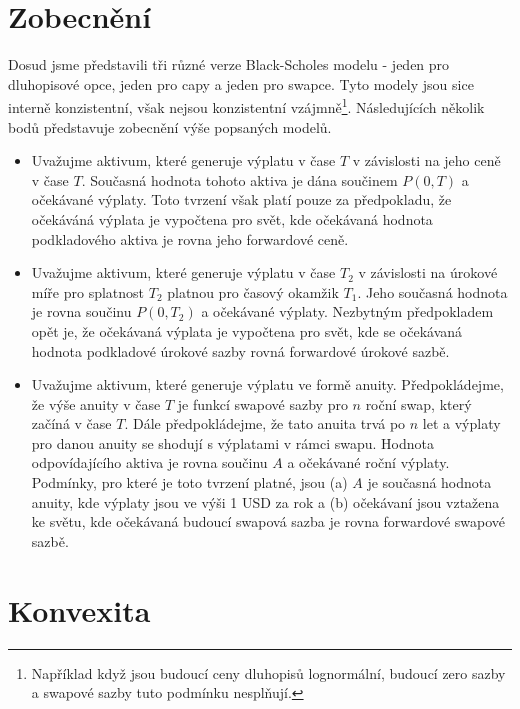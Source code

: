 \documentclass[a4paper]{book}
\begin{document}
\section{Zobecnění}

Dosud jsme představili tři různé verze Black-Scholes modelu - jeden pro dluhopisové opce, jeden pro capy a jeden pro swapce. Tyto modely jsou sice interně konzistentní, však nejsou konzistentní vzájmně\footnote{Například když jsou budoucí ceny dluhopisů lognormální, budoucí zero sazby a swapové sazby tuto podmínku nesplňují.}. Následujících několik bodů představuje zobecnění výše popsaných modelů.
\begin{itemize}
\item Uvažujme aktivum, které generuje výplatu v čase $T$ v závislosti na jeho ceně v čase $T$. Současná hodnota tohoto aktiva je dána součinem $P(0,T)$ a očekávané výplaty. Toto tvrzení však platí pouze za předpokladu, že očekáváná výplata je vypočtena pro svět, kde očekávaná hodnota podkladového aktiva je rovna jeho forwardové ceně.
\item Uvažujme aktivum, které generuje výplatu v čase $T_2$ v závislosti na úrokové míře pro splatnost $T_2$ platnou pro časový okamžik $T_1$. Jeho současná hodnota je rovna součinu $P(0,T_2)$ a očekávané výplaty. Nezbytným předpokladem opět je, že očekávaná výplata je vypočtena pro svět, kde se očekávaná hodnota podkladové úrokové sazby rovná forwardové úrokové sazbě.
\item Uvažujme aktivum, které generuje výplatu ve formě anuity. Předpokládejme, že výše anuity v čase $T$ je funkcí swapové sazby pro $n$ roční swap, který začíná v čase $T$. Dále předpokládejme, že tato anuita trvá po $n$ let a výplaty pro danou anuity se shodují s výplatami v rámci swapu. Hodnota odpovídajícího aktiva je rovna součinu $A$ a očekávané roční výplaty. Podmínky, pro které je toto tvrzení platné, jsou (a) $A$ je současná hodnota anuity, kde výplaty jsou ve výši 1 USD za rok a (b) očekávaní jsou vztažena ke světu, kde očekávaná budoucí swapová sazba je rovna forwardové swapové sazbě.
\end{itemize}

\section{Konvexita}
\end{document}
